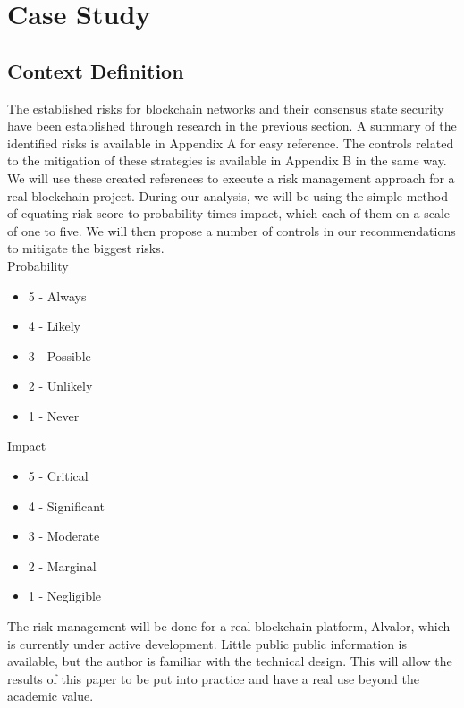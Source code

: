 \documentclass[12pt,a4paper]{article}
\begin{document}
\section{Case Study}

\subsection{Context Definition}

The established risks for blockchain networks and their consensus state security have been established through research in the previous section. A summary of the identified risks is available in Appendix A for easy reference. The controls related to the mitigation of these strategies is available in Appendix B in the same way.\\

We will use these created references to execute a risk management approach for a real blockchain project. During our analysis, we will be using the simple method of equating risk score to probability times impact, which each of them on a scale of one to five. We will then propose a number of controls in our recommendations to mitigate the biggest risks.\\

Probability
\begin{itemize}
  \item 5 - Always
  \item 4 - Likely
  \item 3 - Possible
  \item 2 - Unlikely
  \item 1 - Never
\end{itemize}

Impact
\begin{itemize}
  \item 5 - Critical
  \item 4 - Significant
  \item 3 - Moderate
  \item 2 - Marginal
  \item 1 - Negligible
\end{itemize}

The risk management will be done for a real blockchain platform, Alvalor, which is currently under active development. Little public public information is available, but the author is familiar with the technical design. This will allow the results of this paper to be put into practice and have a real use beyond the academic value.\\
\end{document}
